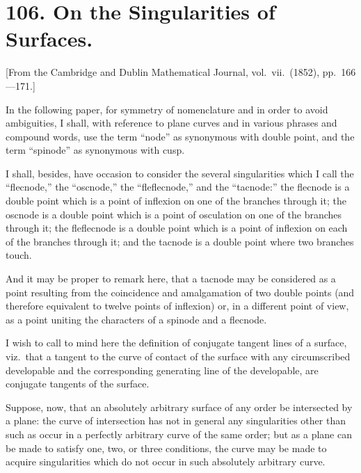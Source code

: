 \documentclass[11pt,a4paper]{article}
\theoremstyle{plain}
\begin{document}
\section*{106. On the Singularities of Surfaces.}

[From the Cambridge and Dublin Mathematical Journal, vol.\ vii.\ (1852), pp.\ 166---171.]

In the following paper, for symmetry of nomenclature and in order to avoid ambiguities, I shall, with reference to plane curves and in various phrases and compound words, use the term ``node'' as synonymous with double point, and the term ``spinode'' as synonymous with cusp.

I shall, besides, have occasion to consider the several singularities which I call the ``flecnode,'' the ``oscnode,'' the ``fleflecnode,'' and the ``tacnode:'' the flecnode is a double point which is a point of inflexion on one of the branches through it; the oscnode is a double point which is a point of osculation on one of the branches through it; the fleflecnode is a double point which is a point of inflexion on each of the branches through it; and the tacnode is a double point where two branches touch.

And it may be proper to remark here, that a tacnode may be considered as a point resulting from the coincidence and amalgamation of two double points (and therefore equivalent to twelve points of inflexion) or, in a different point of view, as a point uniting the characters of a spinode and a flecnode.

I wish to call to mind here the definition of conjugate tangent lines of a surface, viz.\ that a tangent to the curve of contact of the surface with any circumscribed developable and the corresponding generating line of the developable, are conjugate tangents of the surface.

Suppose, now, that an absolutely arbitrary surface of any order be intersected by a plane: the curve of intersection has not in general any singularities other than such as occur in a perfectly arbitrary curve of the same order; but as a plane can be made to satisfy one, two, or three conditions, the curve may be made to acquire singularities which do not occur in such absolutely arbitrary curve.
\end{document}
